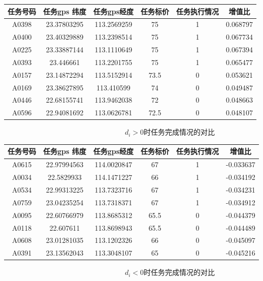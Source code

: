 \documentclass{ctexart}
\begin{document}
\begin{table}[!h]\center\scriptsize
\begin{tabular}{|c|c|c|c|c|c|}
\hline

任务号码&	任务gps 纬度	&任务gps经度	&任务标价	&任务执行情况	&增值比\\
\hline
A0398&	23.37803295&	113.2569259&	75	&1	&0.068797\\
\hline
A0400&	23.40329889	&113.2398514	&75	&1	&0.067734\\
\hline
A0225&	23.33887144&	113.1110649	&75&	1	&0.067394\\
\hline
A0393&	23.446661	&113.2201755	&75	&1	&0.065477\\
\hline
A0157&	23.14872294	&113.5152914	&73.5	&0	&0.053621\\
\hline
A0169&	23.38627895	&113.410599	&74	&0	&0.049487\\
\hline
A0446&	22.68155741&	113.9462038&	72&	0	&0.048663\\
\hline
A0596&	22.94081692&	113.0626781	&72.5	&0	&0.048107\\
\hline


\end{tabular}
\end{table}
\ \ \ \ \ \ \ \ \ \ \ \ \ \ \ \ \ \ \ \ \ \ \ \ \ \ \ \ \ \ \ \ \ \ $d_{i}>0$时任务完成情况的对比
\newpage

  \begin{table}[!h]\center\scriptsize
\begin{tabular}{|c|c|c|c|c|c|}
\hline

任务号码&	任务gps 纬度&	任务gps经度	&任务标价	&任务执行情况	&增值比\\
\hline
A0615&	22.97994563&	114.0020847&	67&	1&	-0.033637\\
\hline
A0034&	22.5829933&	114.1471227&	66&	1&	-0.034192\\
\hline
A0534&	22.99313225&	113.7323716&	67&	1&	-0.034231\\
\hline
A0759&	23.04235254&	113.7318371&	67&	1&	-0.034912\\
\hline
A0095&	22.60766979&	113.8685312&	65.5&	0&	-0.044379\\
\hline
A0118&	22.607611&	113.8698943&	65.5&	0&	-0.044489\\
\hline
A0608&	23.01281035&	113.1202326&	66&	0&	-0.045097\\
\hline
A0391&	23.13562043&	113.3048107&	65&	0&	-0.045216\\
\hline



\end{tabular}


\end{table}
\ \ \ \ \ \ \ \ \ \ \ \ \ \ \ \ \ \ \ \ \ \ \ \ \ \ \ \ \ \ \ \ \ \ $d_{i}<0$时任务完成情况的对比
\end{document}
